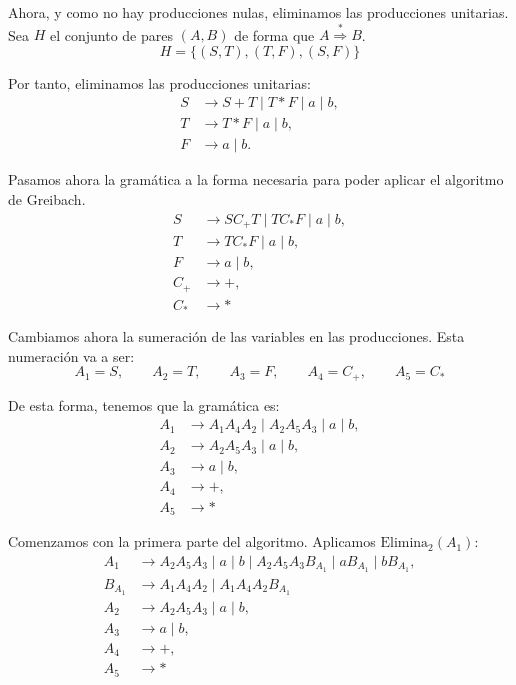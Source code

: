 \documentclass[12pt]{article}
\begin{document}
\begin{ejercicio}[2.5 puntos]
\begin{description}
        Ahora, y como no hay producciones nulas, eliminamos las producciones unitarias.
        Sea $H$ el conjunto de pares $(A,B)$ de forma que $A\stackrel{*}{\Rightarrow} B$.
        \begin{equation*}
            H=\{(S,T),(T,F),(S,F)\}
        \end{equation*}

        Por tanto, eliminamos las producciones unitarias:
        \begin{align*}
            S &\to S + T \mid T * F \mid a \mid b, \\
            T &\to T * F \mid a \mid b, \\
            F &\to a \mid b.
        \end{align*}

        Pasamos ahora la gramática a la forma necesaria para poder aplicar el algoritmo de Greibach.
        \begin{align*}
            S &\to S C_+ T \mid T C_* F  \mid a \mid b, \\
            T &\to T C_* F \mid a \mid b, \\
            F &\to a \mid b,\\
            C_+ &\to +,\\
            C_* &\to *
        \end{align*}

        Cambiamos ahora la sumeración de las variables en las producciones. Esta numeración va a ser:
        \begin{equation*}
            A_1=S,\qquad A_2=T,\qquad A_3=F,\qquad A_4=C_+,\qquad A_5=C_*
        \end{equation*}

        De esta forma, tenemos que la gramática es:
        \begin{align*}
            A_1 &\to A_1 A_4 A_2 \mid A_2 A_5 A_3 \mid a \mid b, \\
            A_2 &\to A_2 A_5 A_3 \mid a \mid b, \\
            A_3 &\to a \mid b,\\
            A_4 &\to +,\\
            A_5 &\to *
        \end{align*}

        Comenzamos con la primera parte del algoritmo. Aplicamos $\text{Elimina}_2(A_1)$:
        \begin{align*}
            A_1 &\to A_2 A_5 A_3 \mid  a \mid b\mid A_2 A_5 A_3 B_{A_1} \mid a B_{A_1} \mid b B_{A_1}, \\
            B_{A_1} &\to A_1 A_4 A_2 \mid A_1 A_4 A_2 B_{A_1} \\
            A_2 &\to A_2 A_5 A_3 \mid  a \mid b, \\
            A_3 &\to  a \mid b,\\
            A_4 &\to +,\\
            A_5 &\to *
        \end{align*}


\end{description}
\end{ejercicio}
\end{document}
